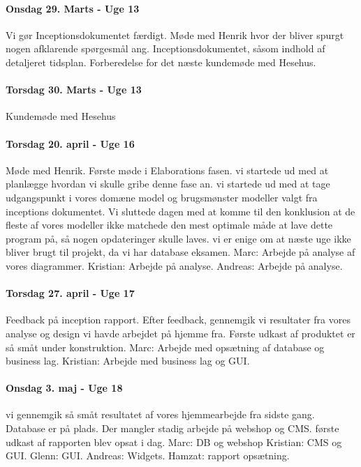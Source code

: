 \paragraph{Onsdag 29. Marts - Uge 13}
Vi gør Inceptionsdokumentet færdigt.
Møde med Henrik hvor der bliver spurgt nogen afklarende spørgesmål ang. Inceptionsdokumentet, såsom indhold af detaljeret tidsplan.
Forberedelse for det næste kundemøde med Hesehus.
 
\paragraph{Torsdag 30. Marts - Uge 13}
Kundemøde med Hesehus
 
 
\paragraph{Torsdag 20. april - Uge 16}
Møde med Henrik.
Første møde i Elaborations fasen. vi startede ud med at planlægge hvordan vi skulle gribe denne fase an. vi startede ud med at tage udgangspunkt i vores domæne model og brugsmønster modeller valgt fra inceptions dokumentet.
Vi sluttede dagen med at komme til den konklusion at de fleste af vores modeller ikke matchede den mest optimale måde at lave dette program på, så nogen opdateringer skulle laves. vi er enige om at næste uge ikke bliver brugt til projekt, da vi har database eksamen.
Marc: Arbejde på analyse af vores diagrammer.
Kristian: Arbejde på analyse.
Andreas: Arbejde på analyse.
 
\paragraph{Torsdag 27. april - Uge 17}
Feedback på inception rapport.
Efter feedback, gennemgik vi resultater fra vores analyse og design vi havde arbejdet på hjemme fra. Første udkast af produktet er så småt under konstruktion.
Marc: Arbejde med opsætning af database og business lag.
Kristian: Arbejde med business lag og GUI.
 
\paragraph{Onsdag 3. maj - Uge 18}
vi gennemgik så småt resultatet af vores hjemmearbejde fra sidste gang. Database er på plads. Der mangler stadig arbejde på webshop og CMS. første udkast af rapporten  blev opsat i dag.
Marc: DB og webshop
Kristian: CMS og GUI.
Glenn: GUI.
Andreas: Widgets.
Hamzat: rapport opsætning.
 
